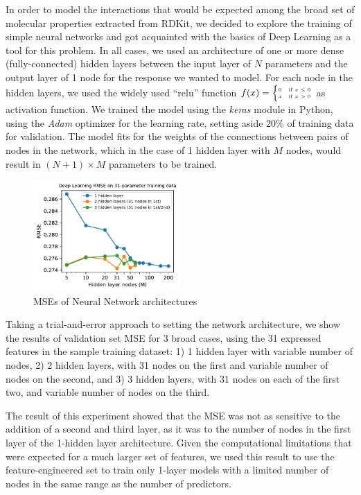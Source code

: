 \documentclass[11pt]{article}
\begin{document}
In order to model the interactions that would be expected among the broad set of molecular properties extracted from RDKit, we decided to explore the training of simple neural networks and got acquainted with the basics of Deep Learning as a tool for this problem. In all cases, we used an architecture of one or more dense (fully-connected) hidden layers between the input layer of $N$ parameters and the output layer of 1 node for the response we wanted to model. For each node in the hidden layers, we used the widely used ``relu'' function $ f(x) = {\tiny \begin{cases} 0 & \text{if } x \le 0 \\ x & \text{if } x>0 \end{cases}}$ as activation function. We trained the model using the \emph{keras} module in Python, using the \emph{Adam} optimizer for the learning rate, setting aside 20\% of training data for validation. The model fits for the weights of the connections between pairs of nodes in the network, which in the case of 1 hidden layer with $M$ nodes, would result in $(N + 1) \times M$ parameters to be trained.

\begin{figure}
\centering
\includegraphics[width=0.5\textwidth]{DL_mse_AC.pdf}
\caption{MSEs of Neural Network architectures}
\label{fig:DL_mse}
\end{figure}
Taking a trial-and-error approach to setting the network architecture, we show the results of validation set MSE for 3 broad cases, using the 31 expressed features in the sample training dataset: 1) 1 hidden layer with variable number of nodes, 2) 2 hidden layers, with 31 nodes on the first and variable number of nodes on the second, and 3) 3 hidden layers, with 31 nodes on each of the first two, and variable number of nodes on the third.

The result of this experiment showed that the MSE was not as sensitive to the addition of a second and third layer, as it was to the number of nodes in the first layer of the 1-hidden layer architecture. Given the computational limitations that were expected for a much larger set of features, we used this result to use the feature-engineered set to train only 1-layer models with a limited number of nodes in the same range as the number of predictors.
\end{document}
